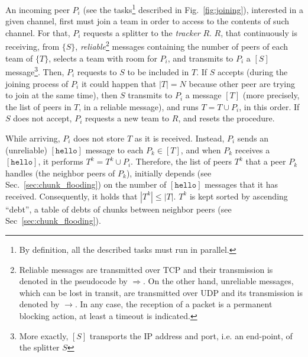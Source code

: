 \label{sec:peer_joining}
\begin{figure*}
   \caption{Tasks involved in a peer
    joining. $P_i$ is the incoming peer, and $P_k$ is a peer that is
    already in the team. $R$ represents the tracker, and $S$ the
    splitter of the team $T$ to which $P_k$ belongs, and $P_i$ will be
    added.\label{fig:joining}}
\end{figure*}
An incoming peer $P_i$ (see the tasks\footnote{By definition, all the
described tasks must run in parallel.} described in
Fig.~\ref{fig:joining}), interested in a given channel, first must
join a team in order to access to the contents of such channel. For
that, $P_i$ requests a splitter to the \emph{tracker} $R$. $R$, that
continuously is receiving, from $\{S\}$,
\emph{reliable}\footnote{Reliable messages are transmitted over TCP
  and their transmission is denoted in the pseudocode by
  $\Rightarrow$. On the other hand, unreliable messages, which can be
  lost in transit, are transmitted over UDP and its transmission is
  denoted by $\rightarrow$. In any case, the reception of a packet is
  a permanent blocking action, at least a timeout is indicated.}
messages containing the number of peers of each team of $\{T\}$,
selects a team with room for $P_i$, and transmits to $P_i$ a $[S]$
message\footnote{More exactly, $[S]$ transports the IP address and
  port, i.e. an end-point, of the splitter $S$}. Then, $P_i$ requests
to $S$ to be included in $T$. If $S$ accepts (during the joining
process of $P_i$ it could happen that $|T|=N$ because other peer are
trying to join at the same time), then $S$ transmits to $P_i$ a
message $[T]$ (more precisely, the list of peers in $T$, in a reliable
message), and runs $T = T \cup P_i$, in this order. If $S$ does not
accept, $P_i$ requests a new team to $R$, and resets the procedure.


While arriving, $P_i$ does not store $T$ as it is received. Instead,
$P_i$ sends an (unreliable) $[\mathtt{hello}]$ message to each $P_k\in
[T]$, and when $P_k$ receives a $[\mathtt{hello}]$, it performs $T^k =
T^k \cup P_i$. Therefore, the list of peers $T^k$ that a peer $P_k$
handles (the neighbor peers of $P_k$), initially depends (see
Sec.~\ref{sec:chunk_flooding}) on the number of $[\mathtt{hello}]$
messages that it has received. Consequently, it holds that $|T^k| \le
|T|$. $T^k$ is kept sorted by ascending ``debt'', a table of debts of
chunks between neighbor peers (see Sec~\ref{sec:chunk_flooding}).

